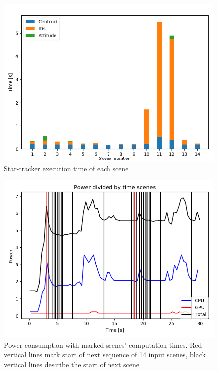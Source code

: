 \documentclass[12pt,a4paper,twoside]{article}
\begin{document}
\begin{figure}[!htbp]
\includegraphics[scale=0.55]{times_plot.png}
\centering
\caption[Star-tracker execution time of each scene]{Star-tracker execution time of each scene}
\label{fig:times_plot}
\end{figure}

\begin{figure}[!htbp]
\includegraphics[scale=0.55]{power_times_plot.png}
\centering
\caption[Power consumption with marked scenes' computation times]{Power consumption with marked scenes' computation times. Red vertical lines mark start of next sequence of 14 input scenes, black vertical lines describe the start of next scene}
\label{fig:power_times_plot}
\end{figure}
\end{document}
